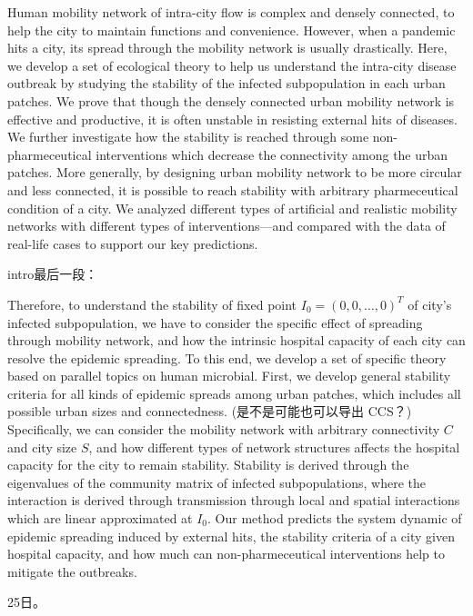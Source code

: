 Human mobility network of intra-city flow is complex and densely connected, to help the city to maintain functions and convenience. However, when a pandemic hits a city, its spread through the mobility network is usually drastically. Here, we develop a set of ecological theory to help us understand the intra-city disease outbreak by studying the stability of the infected subpopulation in each urban patches. We prove that though the densely connected urban mobility network is effective and productive, it is often unstable in resisting external hits of diseases. We further investigate how the stability is reached through some non-pharmeceutical interventions which decrease the connectivity among the urban patches. More generally, by designing urban mobility network to be more circular and less connected, it is possible to reach stability with arbitrary pharmeceutical condition of a city. We analyzed different types of artificial and realistic mobility networks with different types of interventions—and compared with the data of real-life cases to support our key predictions.

intro最后一段：

Therefore, to understand the stability of fixed point $I_0 = (0,0,\dots,0)^T$ of city’s infected subpopulation, we have to consider the specific effect of spreading through mobility network, and how the intrinsic hospital capacity of each city can resolve the epidemic spreading. To this end, we develop a set of specific theory based on parallel topics on human microbial. First, we develop general stability criteria for all kinds of epidemic spreads among urban patches, which includes all possible urban sizes and connectedness. (是不是可能也可以导出 CCS？) Specifically, we can consider the mobility network with arbitrary connectivity $C$ and city size $S$, and how different types of network structures affects the hospital capacity for the city to remain stability. Stability is derived through the eigenvalues of the community matrix of infected subpopulations, where the interaction is derived through transmission through local and spatial interactions which are linear approximated at $I_0$. Our method predicts the system dynamic of epidemic spreading induced by external hits, the stability criteria of a city given hospital capacity, and how much can non-pharmeceutical interventions help to mitigate the outbreaks.



25日。

